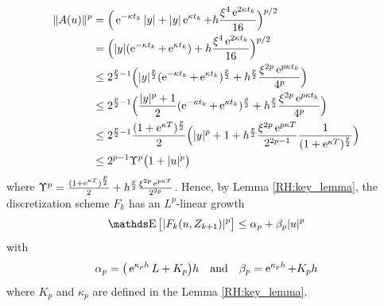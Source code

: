 \begin{equation*}
	\begin{aligned}
		\Vert A(u) \Vert^p
		 & = \Big( \operatorname{e}^{-\kappa t_k} \vert y \vert + \vert y \vert \operatorname{e}^{\kappa t_k} + h \frac{\xi^4 \operatorname{e}^{2 \kappa t_k}}{16} \Big)^{p/2}                                                                                       \\
		 & = \Big( \vert y \vert ( \operatorname{e}^{-\kappa t_k} + \operatorname{e}^{\kappa t_k} ) + h \frac{\xi^4 \operatorname{e}^{2 \kappa t_k}}{16} \Big)^{p/2}                                                                                                 \\
		 & \leq 2^{\frac{p}{2}-1} \Big( \vert y \vert^{\frac{p}{2}} ( \operatorname{e}^{-\kappa t_k} + \operatorname{e}^{\kappa t_k} )^{\frac{p}{2}} + h^{\frac{p}{2}} \frac{\xi^{2p} \operatorname{e}^{p \kappa t_k}}{4^p} \Big)                                    \\
		 & \leq 2^{\frac{p}{2}-1} \Big( \frac{\vert y \vert^{p} + 1}{2} ( \operatorname{e}^{-\kappa t_k} + \operatorname{e}^{\kappa t_k} )^{\frac{p}{2}} + h^{\frac{p}{2}} \frac{\xi^{2p} \operatorname{e}^{p \kappa t_k}}{4^p} \Big)                                \\
		 & \leq 2^{\frac{p}{2}-1} \frac{( 1 + \operatorname{e}^{\kappa T} )^{\frac{p}{2}}}{2} \Big( \vert y \vert^{p} + 1 + h^{\frac{p}{2}} \frac{\xi^{2p} \operatorname{e}^{p \kappa T}}{2^{2p-1}} \frac{1}{( 1 + \operatorname{e}^{\kappa T} )^{\frac{p}{2}}}\Big) \\
		 & \leq 2^{p-1} \Upsilon^p \big( 1 + \vert u \vert^{p} \big)
	\end{aligned}
\end{equation*}
where $\Upsilon^p = \frac{( 1 + \operatorname{e}^{\kappa T} )^{\frac{p}{2}}}{2} + h^{\frac{p}{2}} \frac{\xi^{2p} \operatorname{e}^{p \kappa T}}{2^{2p}}$. Hence, by Lemma \ref{RH:key_lemma}, the discretization scheme $F_k$ has an $L^p$-linear growth
\begin{equation*}
	\E \big[ \vert F_k(u, Z_{k+1}) \vert^p \big] \leq \alpha_{p} + \beta_{p} \vert u \vert^p
\end{equation*}
with
\begin{equation} \label{RH:coefficients_sub_linear}
	\alpha_{p} = \big( \operatorname{e}^{\kappa_p h} L + K_p \big) h \quad \mbox{and} \quad \beta_{p} = \operatorname{e}^{\kappa_p h} + K_p h
\end{equation}
where $K_p$ and $\kappa_p$ are defined in the Lemma \ref{RH:key_lemma}.















